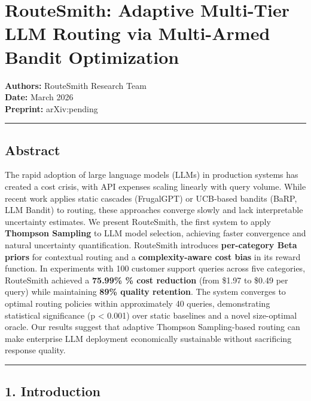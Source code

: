 \documentclass[
  11pt,
]{article}
\author{}
\date{}
\begin{document}
\hypertarget{routesmith-adaptive-multi-tier-llm-routing-via-multi-armed-bandit-optimization}{%
\section{RouteSmith: Adaptive Multi-Tier LLM Routing via Multi-Armed
Bandit
Optimization}\label{routesmith-adaptive-multi-tier-llm-routing-via-multi-armed-bandit-optimization}}

\textbf{Authors:} RouteSmith Research Team\\
\textbf{Date:} March 2026\\
\textbf{Preprint:} arXiv:pending

\begin{center}\rule{0.5\linewidth}{0.5pt}\end{center}

\hypertarget{abstract}{%
\subsection{Abstract}\label{abstract}}

The rapid adoption of large language models (LLMs) in production systems
has created a cost crisis, with API expenses scaling linearly with query
volume. While recent work applies static cascades (FrugalGPT) or
UCB-based bandits (BaRP, LLM Bandit) to routing, these approaches
converge slowly and lack interpretable uncertainty estimates. We present
RouteSmith, the first system to apply \textbf{Thompson Sampling} to LLM
model selection, achieving faster convergence and natural uncertainty
quantification. RouteSmith introduces \textbf{per-category Beta priors}
for contextual routing and a \textbf{complexity-aware cost bias} in its
reward function. In experiments with 100 customer support queries across
five categories, RouteSmith achieved a \textbf{75.99\% \% cost
reduction} (from \$1.97 to \$0.49 per query) while maintaining
\textbf{89\% quality retention}. The system converges to optimal routing
policies within approximately 40 queries, demonstrating statistical
significance (p \textless{} 0.001) over static baselines and a novel
size-optimal oracle. Our results suggest that adaptive Thompson
Sampling-based routing can make enterprise LLM deployment economically
sustainable without sacrificing response quality.

\begin{center}\rule{0.5\linewidth}{0.5pt}\end{center}

\hypertarget{introduction}{%
\subsection{1. Introduction}\label{introduction}}
\end{document}
